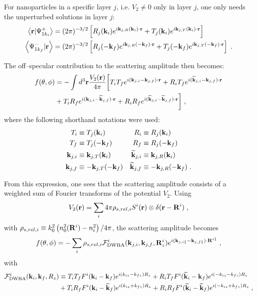 For nanoparticles in a specific layer $j$, i.e. $V_2\neq0$ only in layer $j$, one only needs the unperturbed solutions in layer $j$:
\begin{align*}
  \left\langle \mathbf{r} \vert \Psi^+_{1k_i} \right\rangle &= (2\pi)^{-3/2}\left[ R_j(\mathbf{k}_i) e^{i \mathbf{k}_{j,R}(\mathbf{k}_i)\cdot\mathbf{r}} + T_j(\mathbf{k}_i) e^{i \mathbf{k}_{j,T}(\mathbf{k}_i)\cdot\mathbf{r}} \right] \\
  \left\langle \Psi^-_{1k_f} \vert \mathbf{r} \right\rangle &= (2\pi)^{-3/2}\left[ R_j(-\mathbf{k}_f) e^{i \mathbf{k}_{j,R}(-\mathbf{k}_f)\cdot\mathbf{r}} + T_j(-\mathbf{k}_f) e^{i \mathbf{k}_{j,T}(-\mathbf{k}_f)\cdot\mathbf{r}} \right] \; .
\end{align*}

The off--specular contribution to the scattering amplitude then becomes:
\begin{align*}
  f(\theta, \phi) &= -\int d^3\mathbf{r} \frac{V_2(\mathbf{r})}{4\pi} \biggl[ T_iT_fe^{i(\mathbf{k}_{j,i}-\mathbf{k}_{j,f})\cdot\mathbf{r}} + R_iT_fe^{i(\mathbf{\widetilde{k}}_{j,i}-\mathbf{k}_{j,f})\cdot\mathbf{r}} \\
   & + T_iR_fe^{i(\mathbf{k}_{j,i}-\mathbf{\widetilde{k}}_{j,f})\cdot\mathbf{r}} + R_iR_fe^{i(\mathbf{\widetilde{k}}_{j,i}-\mathbf{\widetilde{k}}_{j,f})\cdot\mathbf{r}} \biggr] \; ,
\end{align*}
where the following shorthand notations were used:
\begin{align*}
  T_i &\equiv  T_j(\mathbf{k}_i) & R_i &\equiv  R_j(\mathbf{k}_i)  \\
  T_f &\equiv  T_j(-\mathbf{k}_f) & R_f &\equiv  R_j(-\mathbf{k}_f) \\
  \mathbf{k}_{j,i} &\equiv \mathbf{k}_{j,T}(\mathbf{k}_i) & \mathbf{\widetilde{k}}_{j,i} &\equiv \mathbf{k}_{j,R}(\mathbf{k}_i)  \\
  \mathbf{k}_{j,f} &\equiv -\mathbf{k}_{j,T}(-\mathbf{k}_f) & \mathbf{\widetilde{k}}_{j,f} &\equiv -\mathbf{k}_{j,R}(-\mathbf{k}_f) \; .
\end{align*}

From this expression, one sees that the scattering amplitude consists of a weighted sum of Fourier transforms of the potential $V_2$. Using
\begin{equation*}
  V_2(\mathbf{r}) = \sum_i 4\pi \rho_{s,rel,i} S^i(\mathbf{r}) \otimes \delta(\mathbf{r} - \mathbf{R}^i) \; ,
\end{equation*}
with $\rho_{s,rel,i}\equiv  k_0^2\left( n_0^2(\mathbf{R}^i) - n_i^2 \right)/4\pi$, the scattering amplitude becomes
\begin{equation*}
  f(\theta, \phi) = -\sum_i  \rho_{s,rel,i} \mathcal{F}^i_{\text{DWBA}}(\mathbf{k}_{j,i},\mathbf{k}_{j,f},\mathbf{R}^i_z)e^{i(\mathbf{k}_{j,i\parallel}-\mathbf{k}_{j,f\parallel})\cdot \mathbf{R}^{i\parallel} } \; ,
\end{equation*}
with
\begin{align*}
  \mathcal{F}^i_\text{DWBA}(\mathbf{k}_i,\mathbf{k}_f,R_z) & \equiv T_iT_fF^i(\mathbf{k}_i-\mathbf{k}_f)e^{i(k_{iz}-k_{fz})R_z} + R_iT_fF^i(\mathbf{\widetilde{k}}_i-\mathbf{k}_f)e^{i(-k_{iz}-k_{fz})R_z} \\
  & + T_iR_fF^i(\mathbf{k}_i-\mathbf{\widetilde{k}}_f)e^{i(k_{iz}+k_{fz})R_z} + R_iR_fF^i(\mathbf{\widetilde{k}}_i-\mathbf{\widetilde{k}}_f)e^{i(-k_{iz}+k_{fz})R_z} \; ,
\end{align*}

